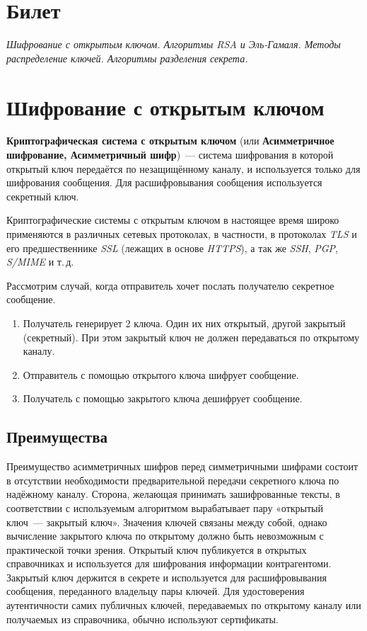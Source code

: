 \documentclass[a4paper,10pt]{article}
\begin{document}
\section*{Билет }
{\em Шифрование с открытым ключом. Алгоритмы RSA и Эль-Гамаля.
Методы распределение ключей. Алгоритмы разделения секрета.}

\section{Шифрование с открытым ключом} 
{\bf Криптографическая система с открытым ключом} (или {\bf Асимметричное шифрование, Асимметричный шифр})~--- система шифрования 
в которой открытый ключ передаётся по незащищённому каналу, и
используется только для шифрования сообщения. Для расшифровывания сообщения используется секретный ключ.

Криптографические системы с открытым ключом в настоящее время широко применяются в различных сетевых протоколах, в частности, в протоколах
{\it TLS\/} и его предшественнике {\it SSL} (лежащих в основе {\it HTTPS}), а так же {\it SSH}, {\it PGP}, {\it S/MIME} и т.\,д.

Рассмотрим случай, когда отправитель хочет послать получателю секретное сообщение.
\begin{enumerate}
   \item Получатель генерирует 2 ключа. Один их них открытый, другой закрытый (секретный). При этом закрытый ключ не должен передаваться по
      открытому каналу.

   \item Отправитель с помощью открытого ключа шифрует сообщение.
 
   \item Получатель с помощью закрытого ключа дешифрует сообщение.

\end{enumerate}

\subsection{Преимущества}
Преимущество асимметричных шифров перед симметричными шифрами состоит в отсутствии необходимости предварительной передачи секретного ключа
по надёжному каналу. Сторона, желающая принимать зашифрованные тексты, в соответствии с используемым алгоритмом вырабатывает пару «открытый
ключ~--- закрытый ключ». Значения ключей связаны между собой, однако вычисление закрытого ключа по открытому должно быть невозможным с
практической точки зрения. Открытый ключ публикуется в открытых справочниках и используется для шифрования информации контрагентоми.
Закрытый ключ держится в секрете и используется для расшифровывания сообщения, переданного владельцу пары ключей.
Для удостоверения аутентичности самих публичных ключей, передаваемых по открытому каналу или получаемых из справочника, обычно
используют сертификаты.
\end{document}
